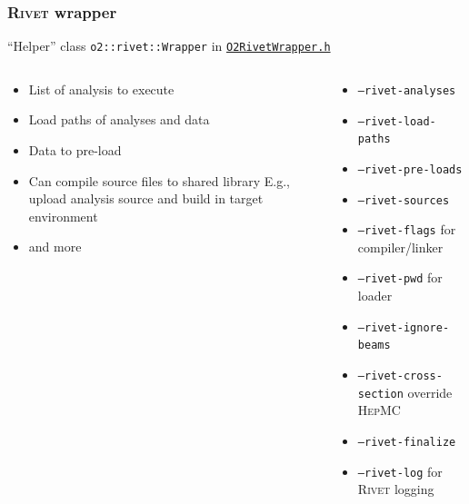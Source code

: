 \documentclass[compress,table,8pt]{beamer}
\newcommand\Rivet{{\scshape Rivet}}
\newcommand\HepMC{{\scshape HepMC}}
\begin{document}
\begin{frame}
  \frametitle{\Rivet{} wrapper}

  ``Helper'' class \texttt{o2::rivet::Wrapper} in
  \href{https://gitlab.com/cholmcc/O2Rivet/-/blob/master/O2RivetWrapper.h}{\texttt{O2RivetWrapper.h}}

  \begin{columns}[onlytextwidth,t]
    \begin{column}{.45\linewidth}
      \begin{itemize}
      \item<+-> List of analysis to execute
      \item<+-> Load paths of analyses and data
      \item<+-> Data to pre-load
      \item<+-> Can compile source files to shared library \newline
        {\footnotesize E.g., upload analysis source and build in
          target environment}
      \item<+-> \textellipsis{} and more
      \end{itemize}
    \end{column}
    \begin{column}{.45\linewidth}
      \begin{itemize}
      \item<1-> \texttt{--rivet-analyses}
      \item<2-> \texttt{--rivet-load-paths}
      \item<3-> \texttt{--rivet-pre-loads}
      \item<4-> \texttt{--rivet-sources}
      \item<5-> \texttt{--rivet-flags} for compiler/linker
      \item<5-> \texttt{--rivet-pwd} for loader
      \item<5-> \texttt{--rivet-ignore-beams}
      \item<5-> \texttt{--rivet-cross-section} override \HepMC{}
      \item<5-> \texttt{--rivet-finalize}
      \item<5-> \texttt{--rivet-log} for \Rivet{} logging
      \end{itemize}
    \end{column}
  \end{columns}
\end{frame}
\end{document}
